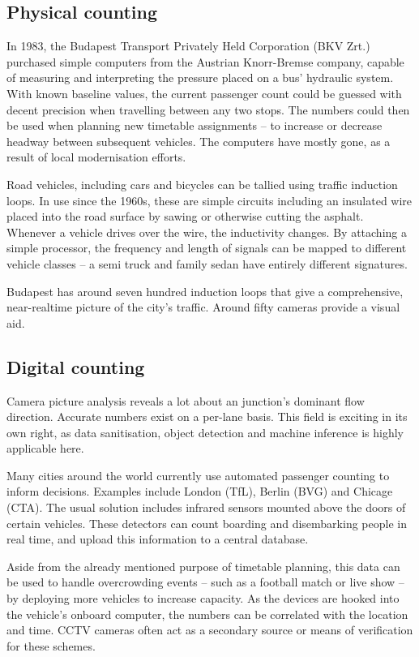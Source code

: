 \subsection{Physical counting}

In 1983, the Budapest Transport Privately Held Corporation (BKV Zrt.) purchased simple computers from the Austrian Knorr-Bremse company, capable of measuring and interpreting the pressure placed on a bus' hydraulic system.\cite{ik260_article} With known baseline values, the current passenger count could be guessed with decent precision when travelling between any two stops. The numbers could then be used when planning new timetable assignments -- to increase or decrease headway between subsequent vehicles. The computers have mostly gone, as a result of local modernisation efforts.

Road vehicles, including cars and bicycles can be tallied using traffic induction loops.\cite{fhwaLoop} In use since the 1960s, these are simple circuits including an insulated wire placed into the road surface by sawing or otherwise cutting the asphalt. Whenever a vehicle drives over the wire, the inductivity changes. By attaching a simple processor, the frequency and length of signals can be mapped to different vehicle classes -- a semi truck and family sedan have entirely different signatures.

Budapest has around seven hundred induction loops that give a comprehensive, near-realtime picture of the city's traffic. Around fifty cameras provide a visual aid.\cite{BkkDataCollection}

\subsection{Digital counting}
Camera picture analysis reveals a lot about an junction's dominant flow direction. Accurate numbers exist on a per-lane basis. This field is exciting in its own right, as data sanitisation, object detection and machine inference is highly applicable here.

Many cities around the world currently use automated passenger counting to inform decisions. Examples include London (TfL), Berlin (BVG) and Chicage (CTA). The usual solution includes infrared sensors mounted above the doors of certain vehicles. These detectors can count boarding and disembarking people in real time, and upload this information to a central database.

Aside from the already mentioned purpose of timetable planning, this data can be used to handle overcrowding events -- such as a football match or live show -- by deploying more vehicles to increase capacity. As the devices are hooked into the vehicle's onboard computer, the numbers can be correlated with the location and time. CCTV cameras often act as a secondary source or means of verification for these schemes.

